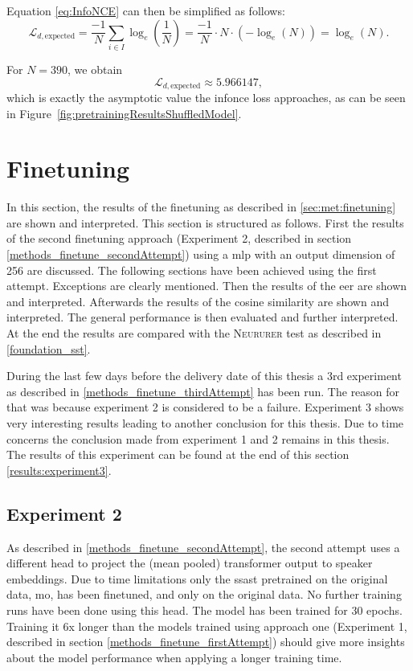Equation \ref{eq:InfoNCE} can then be simplified as follows:
\begin{equation}
\label{eq:expected_infonce}
\mathcal{L}_{d, \text{expected}} = \frac{-1}{N} \sum_{i \in I} \log_e\left(\frac{1}{N}\right) = \frac{-1}{N} \cdot N \cdot \left(-\log_e(N)\right) = \log_e(N).
\end{equation}

For $N=390$, we obtain
$$\mathcal{L}_{d, \text{expected}} \approx 5.966147,$$
which is exactly the asymptotic value the \gls{infonce} loss approaches, as can be seen in Figure~\ref{fig:pretrainingResultsShuffledModel}. 


\FloatBarrier
\pagebreak [3]
\section{Finetuning}
\label{results_finetuning}

In this section, the results of the finetuning as described in \ref{sec:met:finetuning} are shown and interpreted. This section is structured as follows. First the results of the second finetuning approach (Experiment 2, described in section \ref{methods_finetune_secondAttempt}) using a \gls{mlp} with an output dimension of 256 are discussed. The following sections have been achieved using the first attempt. Exceptions are clearly mentioned. Then the results of the \Gls{eer} are shown and interpreted. Afterwards the results of the cosine similarity are shown and interpreted. The general performance is then evaluated and further interpreted. At the end the results are compared with the \textsc{Neururer} test as described in \ref{foundation_sst}. 

During the last few days before the delivery date of this thesis a 3rd experiment as described in \ref{methods_finetune_thirdAttempt} has been run. The reason for that was because experiment 2 is considered to be a failure. Experiment 3 shows very interesting results leading to another conclusion for this thesis. Due to time concerns the conclusion made from experiment 1 and 2 remains in this thesis. The results of this experiment can be found at the end of this section \ref{results:experiment3}.

\subsection{Experiment 2}

As described in \ref{methods_finetune_secondAttempt}, the second attempt uses a different head to project the (mean pooled) transformer output to speaker embeddings. Due to time limitations only the \gls{ssast} pretrained on the original data, \gls{mo}, has been finetuned, and only on the original data. No further training runs have been done using this head. The model has been trained for 30 epochs. Training it 6x longer than the models trained using approach one (Experiment 1, described in section \ref{methods_finetune_firstAttempt}) should give more insights about the model performance when applying a longer training time. 

